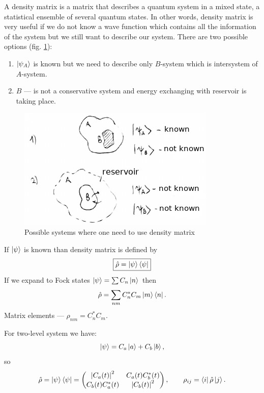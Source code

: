 A density matrix is a matrix that describes a quantum system in a mixed state, a statistical ensemble of several quantum states. In other words, density matrix is very useful if we do not know a wave function which contains all the information of the system but we still want to describe our system. There are two possible options (fig. \ref{fig:densmatr}):
\begin{enumerate}
	\item $\left\lvert {\psi_A} \right\rangle$ is known but we need to describe only $B$-system which is intersystem of $A$-system.
	\item $B$ --- is not a conservative system and energy exchanging with reservoir is taking place.
\end{enumerate}
\begin{figure}
	\centering
	\includegraphics[width=0.7\linewidth]{fig/L5/dens_matr}
	\caption{Possible systems where one need to use density matrix}
	\label{fig:densmatr}
\end{figure}
If $\left\lvert {\psi} \right\rangle$ is known than density matrix is defined by
\begin{equation}
	\boxed{\hat{\rho} = \left\lvert {\psi} \right\rangle \left\langle {\psi} \right\rvert}
\end{equation}
If we expand to Fock states $\left\lvert {\psi} \right\rangle = \sum C_n \left\lvert {n} \right\rangle$ then
\begin{equation}
	\hat{\rho} = \sum_{nm} C_n^* C_m \left\lvert {m} \right\rangle \left\langle {n} \right\rvert.
\end{equation}
Matrix elements --- $\rho_{nm} = C_n^* C_m$.

\begin{testexample}
	For two-level system we have:
	\begin{equation}
		\left\lvert {\psi} \right\rangle = C_a \left\lvert {a} \right\rangle + C_b \left\lvert {b} \right\rangle,
	\end{equation}
	so
	\begin{equation}
		\hat{\rho} = \left\lvert {\psi} \right\rangle \left\langle {\psi} \right\rvert =
		\begin{pmatrix}
			\left| C_a (t) \right|^2 & C_a (t) C_b^*(t) \\
			C_b (t) C_a^*(t) & \left| C_b (t) \right|^2
		\end{pmatrix}, \qquad
		\rho_{ij} = \left\langle {i} \right\rvert \hat{\rho} \left\lvert {j} \right\rangle.
	\end{equation}
\end{testexample}

